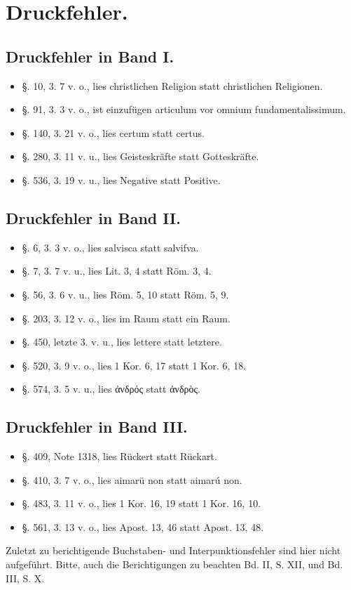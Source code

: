\section*{Druckfehler.}

\subsection*{Druckfehler in Band I.}
\begin{itemize}
\item \S. 10, 3. 7 v. o., lies christlichen Religion statt christlichen Religionen.
\item \S. 91, 3. 3 v. o., ist einzufügen articulum vor omnium fundamentalissimum.
\item \S. 140, 3. 21 v. o., lies certum statt certus.
\item \S. 280, 3. 11 v. u., lies Geisteskräfte statt Gotteskräfte.
\item \S. 536, 3. 19 v. u., lies Negative statt Positive.
\end{itemize}

\subsection*{Druckfehler in Band II.}
\begin{itemize}
\item \S. 6, 3. 3 v. o., lies salvisca statt salvifva.
\item \S. 7, 3. 7 v. u., lies Lit. 3, 4 statt Röm. 3, 4.
\item \S. 56, 3. 6 v. u., lies Röm. 5, 10 statt Röm. 5, 9.
\item \S. 203, 3. 12 v. o., lies im Raum statt ein Raum.
\item \S. 450, letzte 3. v. u., lies lettere statt letztere.
\item \S. 520, 3. 9 v. o., lies 1 Kor. 6, 17 statt 1 Kor. 6, 18.
\item \S. 574, 3. 5 v. u., lies ἀνδρός statt ἀνδρὸς.
\end{itemize}

\subsection*{Druckfehler in Band III.}
\begin{itemize}
\item \S. 409, Note 1318, lies Rückert statt Rückart.
\item \S. 410, 3. 7 v. o., lies aimarü non statt aimarú non.
\item \S. 483, 3. 11 v. o., lies 1 Kor. 16, 19 statt 1 Kor. 16, 10.
\item \S. 561, 3. 13 v. o., lies Apost. 13, 46 statt Apost. 13, 48.
\end{itemize}

Zuletzt zu berichtigende Buchstaben- und Interpunktionsfehler sind hier nicht aufgeführt. Bitte, auch die Berichtigungen zu beachten Bd. II, S. XII, und Bd. III, S. X.